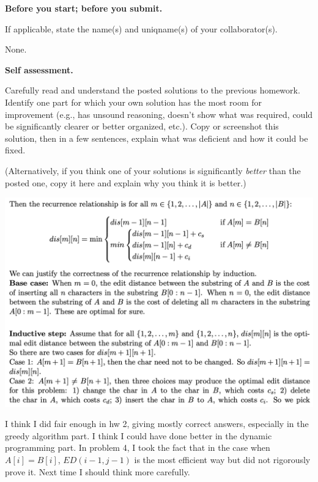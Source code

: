 \documentclass[11pt,addpoints]{exam}
\begin{document}
\begin{questions}
    \addtocounter{question}{-1}

    \question[0] \textbf{Before you start; before you submit.}
  
    If applicable, state the name(s) and uniqname(s) of your collaborator(s).
    
    \begin{solution}
    None.
    \end{solution}

    \question[10] \textbf{Self assessment.}
  
      Carefully read and understand the posted solutions to the previous homework.
      Identify one part for which your own solution has the most room for improvement (e.g., has unsound reasoning, doesn’t show what was required, could be significantly clearer or better organized, etc.).
      Copy or screenshot this solution, then in a few sentences, explain what was deficient and how it could be fixed.
    
      (Alternatively, if you think one of your solutions is significantly \emph{better} than the posted one, copy it here and explain why you think it is better.)

    \begin{solution}
    \begin{center}
      \includegraphics[scale=0.5]{1.png}\\
    \end{center}
    I think I did fair enough in hw 2, giving mostly correct answers, especially in the greedy algorithm part. I think I could have done better in the dynamic programming part. In problem 4, I took the fact that in the case when $A[i] = B[i]$, $ED(i-1, j-1)$ is the most efficient way but did not rigorously prove it. Next time I should think more carefully. 
    \end{solution}


\end{questions}
\end{document}

